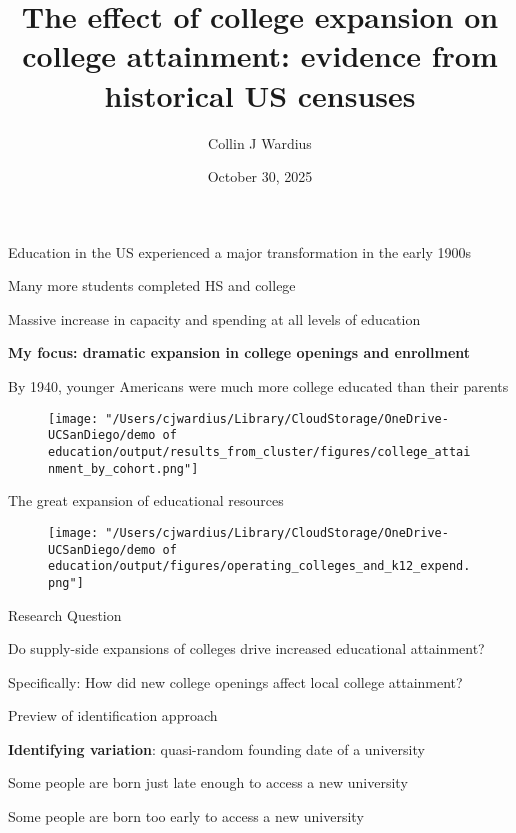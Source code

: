 \documentclass[notes,11pt, aspectratio=169]{beamer}
\title[]{The effect of college expansion on college attainment: evidence from historical US censuses}
\author{Collin J Wardius} %
\institute{
  Department of Economics, UC San Diego
  \newline
  Approved by
}
\date[]{October 30, 2025}
\newenvironment{wideitemize}{\itemize\addtolength{\itemsep}{10pt}}{\enditemize}
\begin{document}
\begin{frame}
  \titlepage
\end{frame}

\begin{frame}{Education in the US experienced a major transformation in the early 1900s}
 \begin{wideitemize}
\item Many more students completed HS and college
\item Massive increase in capacity and spending at all levels of education
\item \textbf{My focus: dramatic expansion in college openings and enrollment}
\end{wideitemize}
\end{frame}

\begin{frame}{By 1940, younger Americans were much more college educated than their parents}
  \begin{figure}
        \centering
        \texttt{[image: "/Users/cjwardius/Library/CloudStorage/OneDrive-UCSanDiego/demo of education/output/results\_from\_cluster/figures/college\_attainment\_by\_cohort.png"]}
    \end{figure}
\end{frame}



\begin{frame}{The great expansion of educational resources}
  \begin{figure}
        \centering
        \texttt{[image: "/Users/cjwardius/Library/CloudStorage/OneDrive-UCSanDiego/demo of education/output/figures/operating\_colleges\_and\_k12\_expend.png"]}
    \end{figure}
\end{frame}

\begin{frame}{Research Question}
\begin{wideitemize}
\item Do supply-side expansions of colleges drive increased educational attainment?
\item Specifically: How did new college openings affect local college attainment?
\end{wideitemize}
\end{frame}

\begin{frame}{Preview of identification approach}
  \begin{wideitemize}
    \item \textbf{Identifying variation}: quasi-random founding date of a university
    \item Some people are born just late enough to access a new university
    \item Some people are born too early to access a new university
  \end{wideitemize}
\end{frame}
\end{document}
